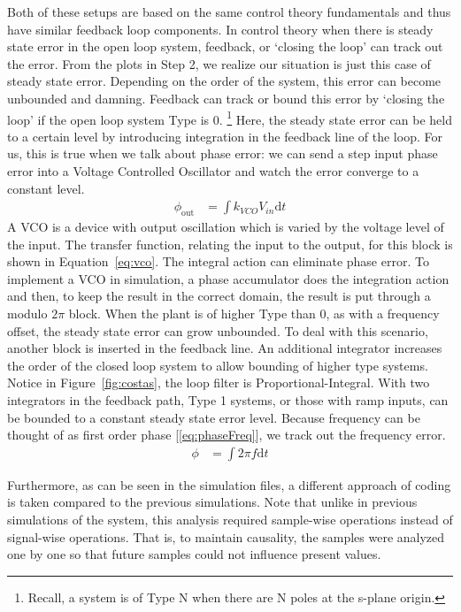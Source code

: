 \documentclass[]{article}
\begin{document}
Both of these setups are based on the same control theory fundamentals and thus have similar feedback loop components. In control theory when there is steady state error in the open loop system, feedback, or `closing the loop' can track out the error.  From the plots in Step 2, we realize our situation is just this case of steady state error.  Depending on the order of the system, this error can become unbounded and damning.  Feedback can track or bound this error by `closing the loop' if the open loop system Type is 0.  \footnote{Recall, a system is of Type N when there are N poles at the s-plane origin.}  Here, the steady state error can be held to a certain level by introducing integration in the feedback line of the loop.  For us, this is true when we talk about phase error: we can send a step input phase error into a Voltage Controlled Oscillator and watch the error converge to a constant level. 
\begin{align}
\label{eq:vco}
\phi_{\text{out}} &= \int \! k_{VCO}V_{in} \mathrm{d}t
\end{align}
A VCO is a device with output oscillation which is varied by the voltage level of the input.  The transfer function, relating the input to the output, for this block is shown in Equation~\ref{eq:vco}. The integral action can eliminate phase error. To implement a VCO in simulation, a phase accumulator does the integration   action and then, to keep the result in the correct domain, the result is put through a modulo $2\pi$ block.   
When the plant is of higher Type than 0, as with a frequency offset, the steady state error can grow unbounded.  To deal with this scenario, another block is inserted in the feedback line.  An additional integrator increases the order of the closed loop system to allow bounding of higher type systems.  Notice in Figure~\ref{fig:costas}, the loop filter is Proportional-Integral.  With two integrators in the feedback path, Type 1 systems, or those with ramp inputs, can be bounded to a constant steady state error level.  Because frequency can be thought of as first order phase [\ref{eq:phaseFreq}], we track out the frequency error.\\
\begin{align}
\label{eq:phaseFreq}
\phi &= \int \! 2\pi f \mathrm{d}t 
\end{align}


Furthermore, as  can be seen in the simulation files, a different approach of coding is taken compared to the previous simulations. Note that unlike in previous simulations of the system, this analysis required sample-wise operations instead of signal-wise operations. That is, to maintain causality, the samples were analyzed one by one so that future samples could not influence present values.\\
\end{document}
